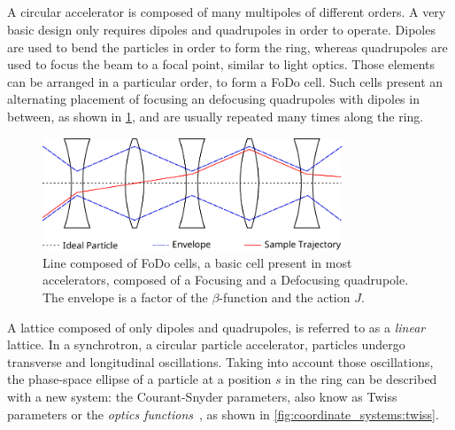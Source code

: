\subsection{}

\subsubsection{}
\label{section:courant_snyder}

A circular accelerator is composed of many multipoles of different orders. A very basic
design only requires dipoles and quadrupoles in order to operate. Dipoles are used to bend the
particles in order to form the ring, whereas quadrupoles are used to focus the beam to a focal
point, similar to light optics.
Those elements can be arranged in a particular order, to form a FoDo cell. Such cells present an
alternating placement of focusing an defocusing quadrupoles with dipoles in between, as shown in
\cref{fig:coordinate_systems:fodo}, and are usually repeated many times along the ring.

\begin{figure}[htb]
    \centering
    \includegraphics[width=0.8\textwidth]{images/fodo_drawing.pdf}
    \caption{Line composed of FoDo cells, a basic cell present in most accelerators, composed of a
    Focusing and a Defocusing quadrupole. The envelope is a factor of the $\beta$-function and the
    action $J$.}
    \label{fig:coordinate_systems:fodo}
\end{figure}

A lattice composed of only dipoles and quadrupoles, is referred to as a \textit{linear} lattice.  In
a synchrotron, a circular particle accelerator, particles undergo transverse and longitudinal 
oscillations. Taking into account those oscillations, the phase-space ellipse of a particle at a 
position $s$ in the ring can be described with a new system: the Courant-Snyder parameters, also
know as Twiss parameters or the \textit{optics functions}~\cite{courant_theory_1958}, as shown in
\cref{fig:coordinate_systems:twiss}.

